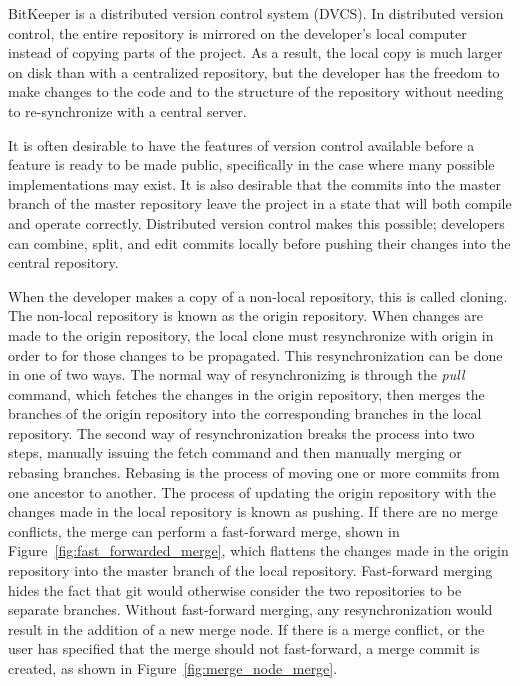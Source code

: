 BitKeeper is a distributed version control system (DVCS).
In distributed version control, the entire repository is mirrored on
the developer's local computer instead of copying parts of the project.
As a result, the local copy is much larger on disk than with a
centralized repository, but the developer has the freedom to make
changes to the code and to the
structure of the repository without needing to re-synchronize with a
central server.

It is often desirable to have the features of version control available
before a feature is ready to be made public, specifically in the case
where many possible implementations may exist.
It is also desirable that the commits into the master branch of the
master repository leave the project in a state that will both compile
and operate correctly.
Distributed version control makes this possible; developers can combine,
split, and edit commits locally before pushing their changes into the
central repository.

When the developer makes a copy of a non-local repository, this is
called cloning.
The non-local repository is known as the origin repository.
When changes are made to the origin repository, the local clone must
resynchronize with origin in order to for those changes to be propagated.
This resynchronization can be done in one of two ways.
The normal way of resynchronizing is through the \textit{pull} command,
which fetches the changes in the origin repository, then merges the
branches of the origin repository into the corresponding branches in the
local repository.
The second way of resynchronization breaks the process into two steps,
manually issuing the fetch command and then manually merging or rebasing
branches.
Rebasing is the process of moving one or more commits from one ancestor
to another.
The process of updating the origin repository with the changes made in
the local repository is known as pushing.
If there are no merge conflicts, the merge can perform a fast-forward
merge, shown in Figure~\ref{fig:fast_forwarded_merge},
which flattens the changes made in the origin repository into the
master branch of the local repository.
Fast-forward merging hides the fact that git would otherwise consider
the two repositories to be separate branches.
Without fast-forward merging, any resynchronization would result in the
addition of a new merge node.
If there is a merge conflict, or the user has specified that the merge
should not fast-forward, a merge commit is created, as shown in
Figure~\ref{fig:merge_node_merge}.

